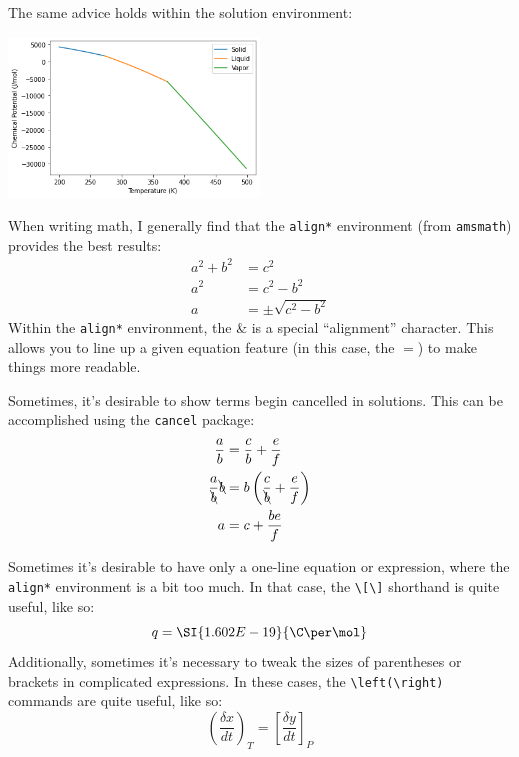 \begin{questions}
\begin{solution}[1in]
The same advice holds within the solution environment:\\
\begin{center}
    \includegraphics[width=0.5\textwidth,keepaspectratio]{figures/equilibriumplot.png}
\end{center}
\end{solution}

\question[4]
When writing math, I generally find that the \verb|align*| environment (from \verb|amsmath|) provides the best results:
\begin{align*}
    a^2 + b^2 &= c^2\\
    a^2 &= c^2 - b^2\\
    a &= \pm \sqrt{c^2 - b^2}
\end{align*}
Within the \verb|align*| environment, the \& is a special ``alignment'' character.
This allows you to line up a given equation feature (in this case, the $=$) to make things more readable.
\begin{solution}[1in]
Sometimes, it's desirable to show terms begin cancelled in solutions.
This can be accomplished using the \verb|cancel| package:
\begin{align*}
    \frac{a}{b} &= \frac{c}{b} + \frac{e}{f}\\
    \frac{a}{\bcancel{b}} \bcancel{b} &= b \left(\frac{c}{\bcancel{b}} + \frac{e}{f}\right)\\
    a &= c + \frac{b e}{f}
\end{align*}
\end{solution}

\question[5]
Sometimes it's desirable to have only a one-line equation or expression, where the \verb|align*| environment is a bit too much.
In that case, the \verb|\[\]| shorthand is quite useful, like so:
\[ q = \SI{1.602E-19}{\C\per\mol}\]
Additionally, sometimes it's necessary to tweak the sizes of parentheses or brackets in complicated expressions.
In these cases, the \verb|\left(\right)| commands are quite useful, like so:
\[ \left(\frac{\delta x}{dt}\right)_T = \left[\frac{\delta y}{dt}\right]_P \]
\end{questions}
